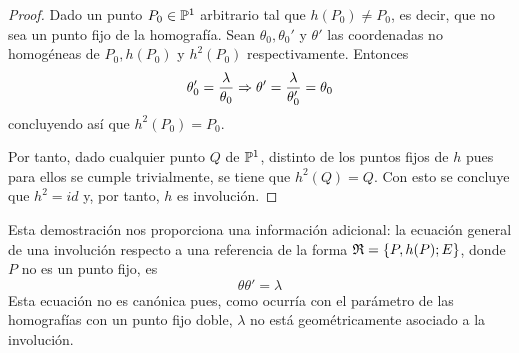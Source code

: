 \begin{proof}
	Dado un punto $P_0\in \mathbb{P}^1$ arbitrario tal que $h(P_0)\not=P_0$, es decir, que no sea un punto fijo de la homografía. Sean $\theta_0,\theta_0'$ y $ \theta'$ las coordenadas no homogéneas de $P_0,h(P_0)$ y $h^2(P_0)$ respectivamente. Entonces
	\begin{equation*}
		\theta_0'=\frac{\lambda}{\theta_0}\Rightarrow \theta'=\frac{\lambda}{\theta_0'}=\theta_0
	\end{equation*}
	concluyendo así que $h^2(P_0)=P_0$. 
	
	Por tanto, dado cualquier punto $Q$ de $\mathbb{P}^1$, distinto de los puntos fijos de $h$ pues para ellos se cumple trivialmente, se tiene que $h^2(Q)=Q$. Con esto se concluye que $h^2=id$ y, por tanto, $h$ es involución.
\end{proof}
Esta demostración nos proporciona una información adicional: la ecuación general de una involución respecto a una referencia de la forma $\mathfrak{R}=\{P,h(P);E\}$, donde $P$ no es un punto fijo, es
\begin{equation}
 \theta\theta'=\lambda
\end{equation}
Esta ecuación no es canónica pues, como ocurría con el parámetro de las homografías con un punto fijo doble, $\lambda$ no está geométricamente asociado a la involución.

